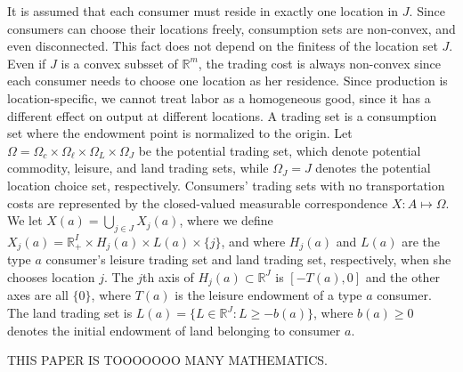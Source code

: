 It is assumed that each consumer must reside in exactly one location in $J$. Since consumers can choose their locations freely, consumption sets are non-convex, and even disconnected. This fact does not depend on the finitess of the location set $J$. Even if $J$ is a convex subsset of $\mathbb{R}^m$, the trading cost is always non-convex since each consumer needs to choose one location as her residence. Since production is location-specific, we cannot treat labor as a homogeneous good, since it has a different effect on output at different locations. A trading set is a consumption set where the endowment point is normalized to the origin. Let $\Omega = \Omega_c \times \Omega_{\ell} \times \Omega_L \times \Omega_J$ be the potential trading set, which denote potential commodity, leisure, and land trading sets, while $\Omega_J = J$ denotes the potential location choice set, respectively. Consumers' trading sets with no transportation costs are represented by the closed-valued measurable correspondence $X: A \mapsto \Omega$. We let $X(a) = \bigcup_{j \in J} X_j(a)$, where we define $X_j(a) = \mathbb{R}_+^I \times H_j(a) \times L(a) \times \{j\}$, and where $H_j(a)$ and $L(a)$ are the type $a$ consumer's leisure trading set and land trading set, respectively, when she chooses location $j$. The $j$th axis of $H_j(a) \subset \mathbb{R}^J$ is $[-T(a), 0]$ and the other axes are all $\{0\}$, where $T(a)$ is the leisure endowment of a type $a$ consumer. The land trading set is $L(a) = \{L \in \mathbb{R}^J: L \geq -b(a)\}$, where $b(a) \geq 0$ denotes the initial endowment of land belonging to consumer $a$.



THIS PAPER IS TOOOOOOO MANY MATHEMATICS.